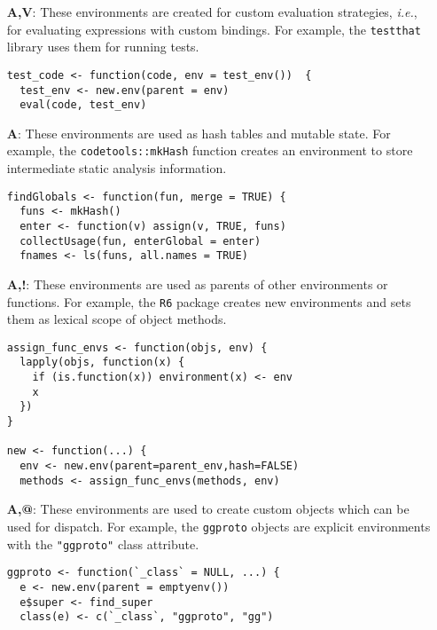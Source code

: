\documentclass[sigplan,screen]{acmart}
\renewcommand{\c}[1]{\lstinline |#1|\xspace}
\newcommand{\ie}{\emph{i.e.},\xspace}
\begin{document}
\begin{itemize}
\item[{\bf A,V}:] These environments are created for custom evaluation
  strategies, \ie for evaluating expressions with custom bindings. For example,
  the \c{testthat} library uses them for running tests.

\begin{lstlisting}
test_code <- function(code, env = test_env())  {
  test_env <- new.env(parent = env)
  eval(code, test_env)
\end{lstlisting}\medskip

  \item[{\bf A}:] These environments are used as hash tables and mutable state.
    For example, the \c{codetools::mkHash} function creates an environment to
    store intermediate static analysis information.

\begin{lstlisting}
findGlobals <- function(fun, merge = TRUE) {
  funs <- mkHash()
  enter <- function(v) assign(v, TRUE, funs)
  collectUsage(fun, enterGlobal = enter)
  fnames <- ls(funs, all.names = TRUE)
\end{lstlisting}\medskip

  \item[{\bf A,!}:] These environments are used as parents of other environments
    or functions. For example, the \c{R6} package creates new environments and
    sets them as lexical scope of object methods.

\begin{lstlisting}
assign_func_envs <- function(objs, env) {
  lapply(objs, function(x) {
    if (is.function(x)) environment(x) <- env
    x
  })
}

new <- function(...) {
  env <- new.env(parent=parent_env,hash=FALSE)
  methods <- assign_func_envs(methods, env)
\end{lstlisting}\medskip
  
  \item[{\bf A,@}:] These environments are used to create custom objects which
    can be used for dispatch. For example, the \c{ggproto} objects are explicit
    environments with the \c{"ggproto"} class attribute.

\begin{lstlisting}
ggproto <- function(`_class` = NULL, ...) {
  e <- new.env(parent = emptyenv())
  e$super <- find_super
  class(e) <- c(`_class`, "ggproto", "gg")
\end{lstlisting}\medskip


\end{itemize}
\end{document}
